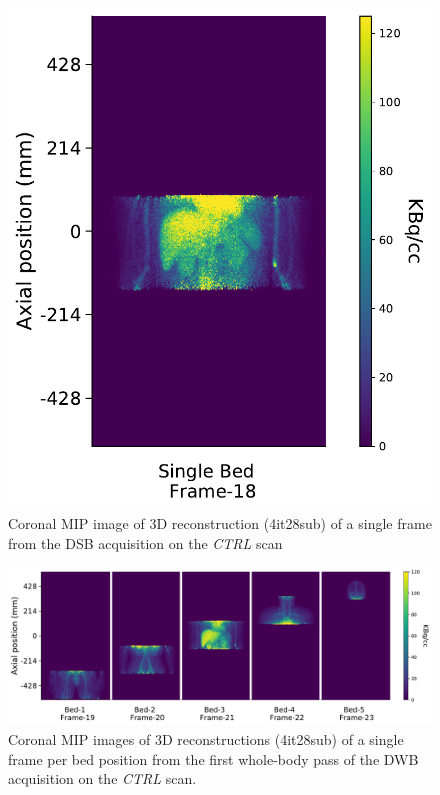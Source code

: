 \begin{figure} [h!]
\centering
\includegraphics[scale=0.52,angle=0]{3_Results/3_3_DWB_Reconstruction/figures/3_3_IsotoPK_CTRL_DSB_3D.pdf}
\caption{Coronal MIP image of 3D reconstruction (4it28sub) of a single frame from the DSB acquisition on the \textit{CTRL} scan}
\label{fig_3_3:IsotoPK_CTRL_DSB_3D}
\end{figure} 

\begin{figure} [h!]
\centering
\includegraphics[scale=0.52,angle=0]{3_Results/3_3_DWB_Reconstruction/figures/3_3_IsotoPK_CTRL_DWB_3D.pdf}
\caption{Coronal MIP images of 3D reconstructions (4it28sub) of a single frame per bed position from the first whole-body pass of the DWB acquisition on the \textit{CTRL} scan.}
\label{fig_3_3:IsotoPK_CTRL_DWB_3D}
\end{figure} 

